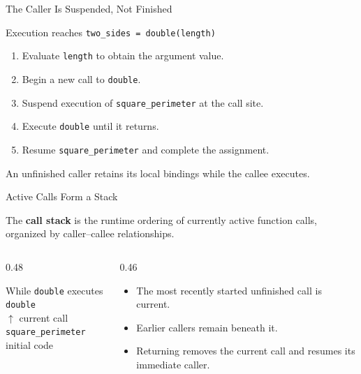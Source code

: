 \documentclass[aspectratio=169,10pt]{beamer}
\begin{document}
\begin{frame}{The Caller Is Suspended, Not Finished}
  \begin{block}{Execution reaches}
    \centering
    \Large\texttt{two\_sides = double(length)}
  \end{block}

  \begin{enumerate}
    \item Evaluate \texttt{length} to obtain the argument value.
    \item Begin a new call to \texttt{double}.
    \item Suspend execution of \texttt{square\_perimeter} at the call site.
    \item Execute \texttt{double} until it returns.
    \item Resume \texttt{square\_perimeter} and complete the assignment.
  \end{enumerate}

  \begin{keyidea}
    An unfinished caller retains its local bindings while the callee executes.
  \end{keyidea}
\end{frame}

\begin{frame}{Active Calls Form a Stack}
  \begin{cpdefinition}
    The \textbf{call stack} is the runtime ordering of currently active function calls, organized by caller--callee relationships.
  \end{cpdefinition}

  \begin{columns}[T,onlytextwidth]
    \begin{column}{0.48\textwidth}
      \begin{block}{While \texttt{double} executes}
        \centering
        \texttt{double}\\
        $\uparrow$ current call\\[0.08in]
        \texttt{square\_perimeter}\\[0.08in]
        initial code
      \end{block}
    \end{column}

    \begin{column}{0.46\textwidth}
      \begin{itemize}
        \item The most recently started unfinished call is current.
        \item Earlier callers remain beneath it.
        \item Returning removes the current call and resumes its immediate caller.
      \end{itemize}
    \end{column}
  \end{columns}
\end{frame}
\end{document}
